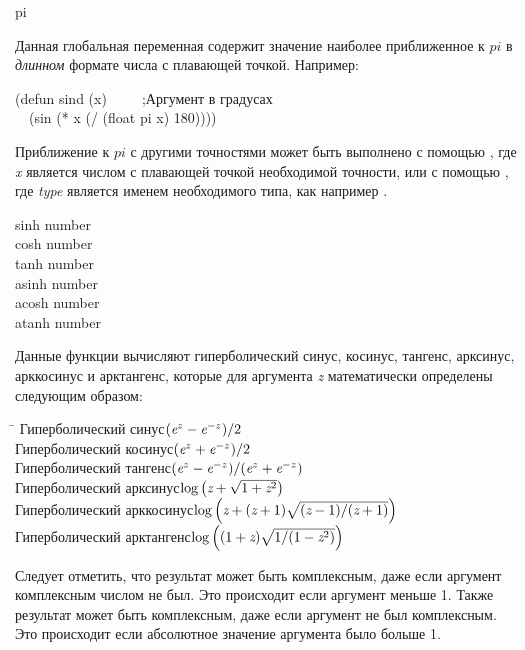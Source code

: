 \begin{defun}[Константа]
pi

Данная глобальная переменная содержит значение наиболее приближенное к $pi$ в
\emph{длинном} формате числа с плавающей точкой.
Например:
\begin{lisp}
(defun sind (x)~~~~~;\textrm{Аргумент в градусах} \\
~~(sin (* x (/ (float pi x) 180))))
\end{lisp}
Приближение к $pi$ с другими точностями может быть выполнено с помощью
, где \emph{x} является числом с плавающей точкой
необходимой точности, или с помощью  , где
\emph{type} является именем необходимого типа, как например .
\end{defun}

\relax

\begin{defun}[Функция]
sinh number \\
cosh number \\
tanh number \\
asinh number \\
acosh number \\
atanh number

Данные функции вычисляют гиперболический синус, косинус, тангенс, арксинус,
арккосинус и арктангенс, которые для аргумента \emph{z} математически определены
следующим образом:
\begin{tabbing}
\hskip 10pc\=\kill
Гиперболический синус\>$ (\emph{e}^{z}-\emph{e}^{-z})/2 $ \\
Гиперболический косинус\>$ (\emph{e}^{z}+\emph{e}^{-z})/2 $ \\
Гиперболический тангенс\>$ (\emph{e}^{z}-\emph{e}^{-z})/(\emph{e}^{z}+\emph{e}^{-z}) $ \\[2pt]
Гиперболический арксинус\>$ \log \left(\emph{z}+\sqrt{1+\emph{z}^2}\right) $ \\[2pt]
Гиперболический арккосинус\>$ \log
\left(\emph{z}+(\emph{z}+1)\sqrt{(\emph{z}-1)/(\emph{z}+1)}\right) $ \\[2pt]
Гиперболический арктангенс\>$ \log \left((1+\emph{z})\sqrt{1/(1-\emph{z}^2)}\right) $
\end{tabbing}

Следует отметить, что результат  может быть комплексным, даже если
аргумент комплексным числом не был. Это происходит если аргумент меньше 1.
Также результат  может быть комплексным, даже если аргумент не был
комплексным. Это происходит если абсолютное значение аргумента было больше 1.
\end{defun}

